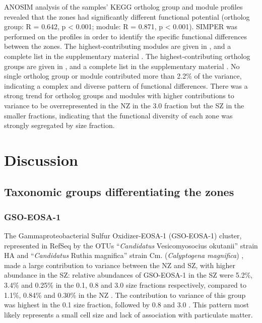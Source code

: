 \ac{ANOSIM} analysis of the samples' \ac{KEGG} ortholog group and module profiles revealed that the zones had significantly different functional potential (ortholog group: R = 0.642, p < 0.001; module: R = 0.871, p < 0.001). 
\ac{SIMPER} was performed on the profiles in order to identify the specific functional differences between the zones. 
The highest-contributing modules are given in , and a complete list in the supplementary material .
The highest-contributing ortholog groups are given in , and a complete list in the supplementary material .
No single ortholog group or module contributed more than 2.2\% of the variance, indicating a complex and diverse pattern of functional differences. 
There was a strong trend for ortholog groups and modules with higher contributions to variance to be overrepresented in the \ac{NZ} in the 3.0 \micron{} fraction but the \ac{SZ} in the smaller fractions, indicating that the functional diversity of each zone was strongly segregated by size fraction.




\section{Discussion}

\subsection{Taxonomic groups differentiating the zones}

\subsubsection{GSO-EOSA-1}

The Gammaproteobacterial Sulfur Oxidizer-EOSA-1 (GSO-EOSA-1) cluster, represented in RefSeq by the \acp{OTU} ``\emph{Candidatus} Vesicomyosocius okutanii'' strain HA and ``\emph{Candidatus} Ruthia magnifica'' strain Cm. (\emph{Calyptogena magnifica}) \cite{Walsh:2009fja}, made a large contribution to variance between the \ac{NZ} and \ac{SZ}, with higher abundance in the \ac{SZ}: relative abundances of GSO-EOSA-1 in the \ac{SZ} were 5.2\%, 3.4\% and 0.25\% in the 0.1, 0.8 and 3.0 \micron{} size fractions respectively, compared to 1.1\%, 0.84\% and 0.30\% in the \ac{NZ} .
The contribution to variance of this group was highest in the 0.1 \micron{} size fraction, followed by 0.8 \micron{} and 3.0 \micron{} .
This pattern most likely represents a small cell size and lack of association with particulate matter.

